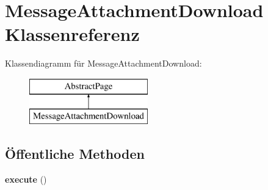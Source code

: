\hypertarget{class_message_attachment_download}{}\section{Message\+Attachment\+Download Klassenreferenz}
\label{class_message_attachment_download}
Klassendiagramm für Message\+Attachment\+Download\+:\begin{figure}[H]
\begin{center}
\leavevmode
\includegraphics[height=2.000000cm]{class_message_attachment_download}
\end{center}
\end{figure}
\subsection*{Öffentliche Methoden}
\begin{DoxyCompactItemize}
\item 
\mbox{\label{class_message_attachment_download_a28a077abbebf3b894e7e2c1d6e256a51}} 
{\bfseries execute} ()
\end{DoxyCompactItemize}
